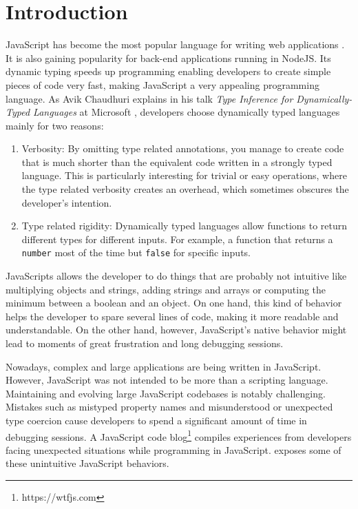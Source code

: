 \chapter{Introduction}\label{chap:introduction}

JavaScript has become the most popular language for writing web applications \citep{github-statistics}. It is also gaining popularity for back-end applications running in NodeJS. Its dynamic typing speeds up programming enabling developers to create simple pieces of code very fast, making JavaScript a very appealing programming language. As Avik Chaudhuri explains in his talk \textit{Type Inference for Dynamically-Typed Languages} at Microsoft \citep{type-inference-microsoft-research-video}, developers choose dynamically typed languages mainly for two reasons:

\begin{enumerate}
	\item Verbosity: By omitting type related annotations, you manage to create code that is much shorter than the equivalent code written in a strongly typed language. This is particularly interesting for trivial or easy operations, where the type related verbosity creates an overhead, which sometimes obscures the developer's intention.

	\item Type related rigidity: Dynamically typed languages allow functions to return different types for different inputs. For example, a function that returns a \texttt{number} most of the time but \texttt{false} for specific inputs.
\end{enumerate}

JavaScripts allows the developer to do things that are probably not intuitive like multiplying objects and strings, adding strings and arrays or computing the minimum between a boolean and an object. On one hand, this kind of behavior helps the developer to spare several lines of code, making it more readable and understandable. On the other hand, however, JavaScript's native behavior might lead to moments of great frustration and long debugging sessions.

Nowadays, complex and large applications are being written in JavaScript. However, JavaScript was not intended to be more than a scripting language. Maintaining and evolving large JavaScript codebases is notably challenging. Mistakes such as mistyped property names and misunderstood or unexpected type coercion cause developers to spend a significant amount of time in debugging sessions. A JavaScript code blog\footnote{https://wtfjs.com} compiles experiences from developers facing unexpected situations while programming in JavaScript.  exposes some of these unintuitive JavaScript behaviors.

